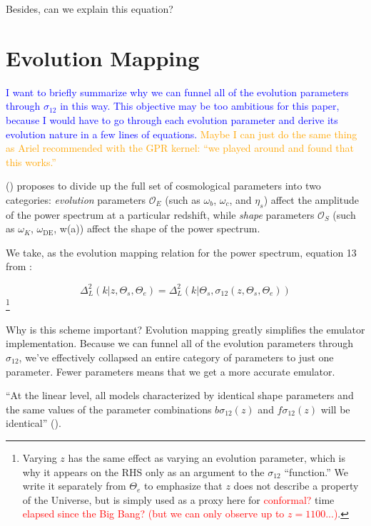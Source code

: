 Besides, can we explain this equation?


\section{Evolution Mapping}
\label{sec: ev_mapping_intro}

\textcolor{blue}{I want to briefly summarize why we can funnel all of the 
evolution parameters through $\sigma_{12}$ in this way. This objective may be
too ambitious for this paper, because I would have to go through each
evolution parameter and derive its evolution nature in a few lines of 
equations.} \textcolor{orange}{Maybe I can just do the same thing as Ariel
recommended with the GPR kernel: ``we played around and found that this
works.''}

() proposes to divide up the full set of cosmological
parameters into two categories: \textit{evolution} parameters $\mathcal{O}_E$
(such as $\omega_b$, $\omega_c$, and $\eta_s$)
affect the amplitude of the power spectrum at a particular redshift, while
\textit{shape} parameters $\mathcal{O}_S$
(such as $\omega_K$, $\omega_\text{DE}$, w(a))
affect the shape of the power
spectrum.

We take, as the evolution mapping relation for the power spectrum, equation 13
from :

\begin{equation}
\label{eq: evMapping_pSpectrum}
    \Delta^2_L (k | z, \Theta_s, \Theta_e)
    =
    \Delta_L^2 (k | \Theta_s, \sigma_{12} \left( z, \Theta_s, \Theta_e \right))
\end{equation}\footnote{Varying $z$ has the same effect as varying an
evolution parameter, which is why it appears on the RHS only as an argument to
the $\sigma_{12}$ ``function.'' We write it separately from $\Theta_e$ to
emphasize that $z$ does not describe a property of the Universe, but is
simply used as a proxy here for \textcolor{red}{conformal?} time
\textcolor{red}{elapsed since the Big Bang? (but we can only observe up to
$z = 1100$...)}.}

Why is this scheme important? Evolution mapping greatly simplifies the emulator
implementation. Because we can
funnel all of the evolution parameters through $\sigma_{12}$, we've effectively
collapsed an entire category of parameters to just one parameter. Fewer
parameters means that we get a more accurate emulator.

``At the linear level, all models characterized by identical shape parameters
and the same values of the parameter combinations $b \sigma_{12}(z)$ and
$f \sigma_{12}(z)$ will be identical'' ().

